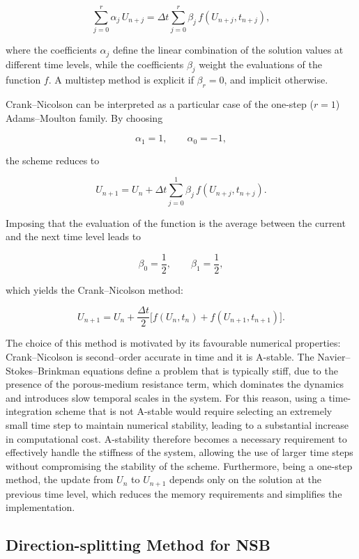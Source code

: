\documentclass[12pt]{article}
\begin{document}
\[
    \sum_{j=0}^{r} \alpha_j\, U_{n+j}
    =
    \Delta t \sum_{j=0}^{r} \beta_j\, f(U_{n+j}, t_{n+j}),
\]

where the coefficients \(\alpha_j\) define the linear combination of the 
solution values at different time levels, while the coefficients \(\beta_j\) 
weight the evaluations of the function \(f\).
A multistep method is explicit if \(\beta_r = 0\), and implicit otherwise.

Crank--Nicolson can be interpreted as a particular case of the one-step 
(\(r = 1\)) Adams--Moulton family. By choosing

\[
    \alpha_1 = 1, 
    \qquad 
    \alpha_0 = -1,
\]

the scheme reduces to

\[
    U_{n+1}
    =
    U_n + \Delta t \sum_{j=0}^{1} \beta_j\, f(U_{n+j}, t_{n+j}).
\]

Imposing that the evaluation of the function is the average between the 
current and the next time level leads to

\[
    \beta_0 = \frac{1}{2},
    \qquad
    \beta_1 = \frac{1}{2},
\]

which yields the Crank--Nicolson method:

\[
    U_{n+1}
    =
    U_n
    + 
    \frac{\Delta t}{2}\big[
        f(U_n, t_n) 
        + 
        f(U_{n+1}, t_{n+1})
    \big].
\]

The choice of this method is motivated by its favourable numerical properties: 
Crank--Nicolson is second--order accurate in time and it is A-stable.  
The Navier--Stokes--Brinkman equations define a problem that is typically stiff, 
due to the presence of the porous-medium resistance term, which dominates the 
dynamics and introduces slow temporal scales in the system. For this reason, 
using a time-integration scheme that is not A-stable would require selecting 
an extremely small time step to maintain numerical stability, leading to a 
substantial increase in computational cost. A-stability therefore becomes a 
necessary requirement to effectively handle the stiffness of the system, 
allowing the use of larger time steps without compromising the stability of 
the scheme.  
Furthermore, being a one-step method, the update from \(U_n\) to \(U_{n+1}\) 
depends only on the solution at the previous time level, which reduces the 
memory requirements and simplifies the implementation.

\subsection{Direction-splitting Method for NSB}
\end{document}
